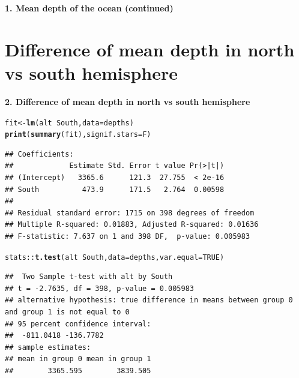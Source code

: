\documentclass[10pt,handout]{beamer}\usepackage[]{graphicx}\usepackage[]{color}
\makeatletter
\newcommand{\hlnum}[1]{\textcolor[rgb]{0.686,0.059,0.569}{#1}}%
\newcommand{\hlopt}[1]{\textcolor[rgb]{0,0,0}{#1}}%
\newcommand{\hlstd}[1]{\textcolor[rgb]{0.345,0.345,0.345}{#1}}%
\newcommand{\hlkwb}[1]{\textcolor[rgb]{0.69,0.353,0.396}{#1}}%
\newcommand{\hlkwc}[1]{\textcolor[rgb]{0.333,0.667,0.333}{#1}}%
\newcommand{\hlkwd}[1]{\textcolor[rgb]{0.737,0.353,0.396}{\textbf{#1}}}%
\newenvironment{kframe}{%
 \def\at@end@of@kframe{}%
 \ifinner\ifhmode%
  \def\at@end@of@kframe{\end{minipage}}%
  \begin{minipage}{\columnwidth}%
 \fi\fi%
 \def\FrameCommand##1{\hskip\@totalleftmargin \hskip-\fboxsep
 \colorbox{shadecolor}{##1}\hskip-\fboxsep
     \hskip-\linewidth \hskip-\@totalleftmargin \hskip\columnwidth}%
 \MakeFramed {\advance\hsize-\width
   \@totalleftmargin\z@ \linewidth\hsize
   \@setminipage}}%
 {\par\unskip\endMakeFramed%
 \at@end@of@kframe}
\newenvironment{knitrout}{}{} %
\makeatother
\begin{document}
\begin{frame}
	\vspace*{-5.0in}
	\textbf{1. Mean depth of the ocean (continued)}
	
\end{frame}


\section{Difference of mean depth in north vs south hemisphere}

\begin{frame}
\vspace*{-.90551in}
\textbf{2. Difference of mean depth in north vs south hemisphere}

	
	
\begin{knitrout}\tiny
{}\color{fgcolor}\begin{kframe}
\begin{alltt}
\hlstd{fit} \hlkwb{<-} \hlkwd{lm}\hlstd{(alt} \hlopt{~} \hlstd{South,} \hlkwc{data} \hlstd{= depths)}
\hlkwd{print}\hlstd{(}\hlkwd{summary}\hlstd{(fit),} \hlkwc{signif.stars} \hlstd{= F)}
\end{alltt}
\begin{verbatim}
## Coefficients:
##             Estimate Std. Error t value Pr(>|t|)
## (Intercept)   3365.6      121.3  27.755  < 2e-16
## South          473.9      171.5   2.764  0.00598
## 
## Residual standard error: 1715 on 398 degrees of freedom
## Multiple R-squared: 0.01883,	Adjusted R-squared: 0.01636 
## F-statistic: 7.637 on 1 and 398 DF,  p-value: 0.005983
\end{verbatim}
\begin{alltt}
\hlstd{stats}\hlopt{::}\hlkwd{t.test}\hlstd{(alt} \hlopt{~} \hlstd{South,} \hlkwc{data} \hlstd{= depths,} \hlkwc{var.equal} \hlstd{=} \hlnum{TRUE}\hlstd{)}
\end{alltt}
\begin{verbatim}
##  Two Sample t-test with alt by South 
## t = -2.7635, df = 398, p-value = 0.005983
## alternative hypothesis: true difference in means between group 0 and group 1 is not equal to 0 
## 95 percent confidence interval:
##  -811.0418 -136.7782 
## sample estimates:
## mean in group 0 mean in group 1 
##        3365.595        3839.505
\end{verbatim}
\end{kframe}
\end{knitrout}
\end{frame}
\end{document}
